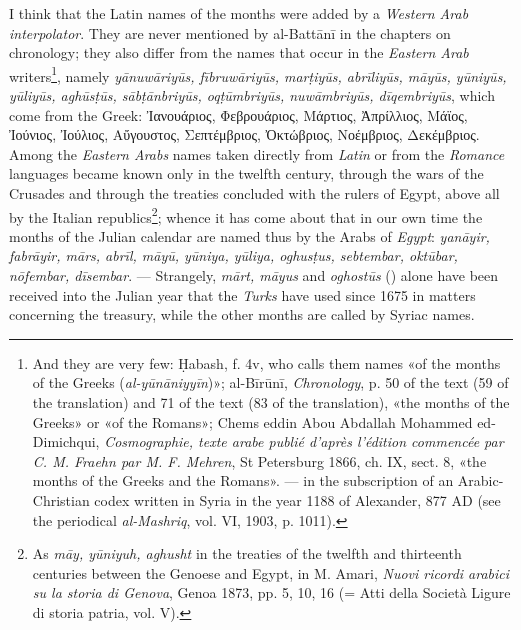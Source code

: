 \documentclass[11pt]{article}
\begin{document}
\par I think that the Latin names of the months were added by a \emph{Western Arab interpolator}. They are never mentioned by al-Battānī in the chapters on chronology; they also differ from the names that occur in the \emph{Eastern Arab} writers\footnote{And they are very few: Ḥabash, f. 4v, who calls them names «of the months of the Greeks (\emph{al-yūnāniyyīn})»; al-Bīrūnī, \emph{Chronology}, p. 50 of the text (59 of the translation) and 71 of the text (83 of the translation), «the months of the Greeks» or «of the Romans»; Chems eddin Abou Abdallah Mohammed ed-Dimichqui, \emph{Cosmographie, texte arabe publié d'après l'édition commencée par C. M. Fraehn par M. F. Mehren}, St Petersburg 1866, ch. IX, sect. 8, «the months of the Greeks and the Romans». —  in the subscription of an Arabic-Christian codex written in Syria in the year 1188 of Alexander, 877 AD (see the periodical \emph{al-Mashriq}, vol. VI, 1903, p. 1011).}, namely \emph{yānuwāriyūs, fībruwāriyūs, marṭiyūs, abrīliyūs, māyūs, yūniyūs, yūliyūs, aghūsṭūs, sābṭānbriyūs, oqṭūmbriyūs, nuwāmbriyūs, dīqembriyūs}, which come from the Greek: {\greekfont Ἰανουάριος, Φεβρουάριος, Μάρτιος, Ἀπρίλλιος, Μάϊος, Ἰούνιος, Ἰούλιος, Αὔγουστος, Σεπτέμβριος, Ὀκτώβριος, Νοέμβριος, Δεκέμβριος}. Among the \emph{Eastern Arabs} names taken directly from \emph{Latin} or from the \emph{Romance} languages became known only in the twelfth century, through the wars of the Crusades and through the treaties concluded with the rulers of Egypt, above all by the Italian republics\footnote{As \emph{māy, yūniyuh, aghusht} in the treaties of the twelfth and thirteenth centuries between the Genoese and Egypt, in M. Amari, \emph{Nuovi ricordi arabici su la storia di Genova}, Genoa 1873, pp. 5, 10, 16 (= Atti della Società Ligure di storia patria, vol. V).}; whence it has come about that in our own time the months of the Julian calendar are named thus by the Arabs of \emph{Egypt}: \emph{yanāyir, fabrāyir, mārs, abrīl, māyū, yūniya, yūliya, oghusṭus, sebtembar, oktūbar, nōfembar, dīsembar}. — Strangely, \emph{mārt, māyus} and \emph{oghostūs} () alone have been received into the Julian year that the \emph{Turks} have used since 1675 in matters concerning the treasury, while the other months are called by Syriac names.\par
\end{document}
